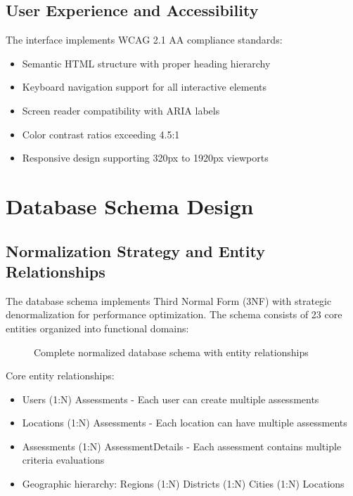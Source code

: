 \documentclass[a4paper,12pt,oneside]{book}
\begin{document}
\section{User Experience and Accessibility}

The interface implements WCAG 2.1 AA compliance standards:

\begin{itemize}
    \item Semantic HTML structure with proper heading hierarchy
    \item Keyboard navigation support for all interactive elements
    \item Screen reader compatibility with ARIA labels
    \item Color contrast ratios exceeding 4.5:1
    \item Responsive design supporting 320px to 1920px viewports
\end{itemize}

\chapter{Database Schema Design}
\section{Normalization Strategy and Entity Relationships}

The database schema implements Third Normal Form (3NF) with strategic denormalization for performance optimization. The schema consists of 23 core entities organized into functional domains:

\begin{figure}[h]
\centering
{}
\caption{Complete normalized database schema with entity relationships}
\label{fig:database-schema}
\end{figure}

Core entity relationships:
\begin{itemize}
    \item Users (1:N) Assessments - Each user can create multiple assessments
    \item Locations (1:N) Assessments - Each location can have multiple assessments
    \item Assessments (1:N) AssessmentDetails - Each assessment contains multiple criteria evaluations
    \item Geographic hierarchy: Regions (1:N) Districts (1:N) Cities (1:N) Locations
\end{itemize}
\end{document}
